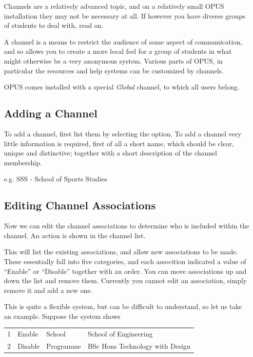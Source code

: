 \documentclass[12 pt]{book}
\begin{document}
Channels are a relatively advanced topic, and on a relatively small OPUS
installation they may not be necessary at all. If however you have diverse
groups of students to deal with, read on.

A channel is a means to restrict the audience of some aspect of communication,
and so allows you to create a more local feel for a group of students in what
might otherwise be a very anonymous system. Various parts of OPUS, in particular
the resources and help systems can be customized by channels.

OPUS comes installed with a special \emph{Global} channel, to which all users
belong.

\subsection{Adding a Channel}

To add a channel, first list them by selecting the 
 option. To add a channel very little
information is required, first of all a short name, which should be clear,
unique and distinctive; together with a short description of the channel
membership.

e.g. SSS - School of Sports Studies

\subsection{Editing Channel Associations}
\label{ChannelAssociations}

Now we can edit the channel associations to determine who is included within
the channel. An  action is shown in the channel list.

This will list the existing associations, and allow new associations to be
made. These essentially fall into five categories, and each assocition 
indicated a value of ``Enable'' or ``Disable'' together with an order. You
can move associations up and down the list and remove them. Currently you
cannot edit an association, simply remove it and add a new one.

This is quite a flexible system, but can be difficult to understand, so
let us take an example. Suppose the system shows

\begin{tabular}{llll}
1 & Enable & School & School of Engineering \\
2 & Disable & Programme & BSc Hons Technology with Design \\
\end{tabular}
\end{document}
